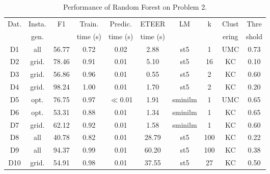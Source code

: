 \begin{table}[t]
{\small
\begin{center}  
\setlength{\tabcolsep}{2pt}
\caption{Performance of Random Forest on Problem 2.} 
\vspace{-10pt}
\label{tab:lr-with-data-features}
\begin{tabular}{|c|c|c|c|c|c|c|c|c|c|}
\hline
\multirow{2}{*}{Dat.} & Insta. & \multirow{2}{*}{F1} & Train.  & Predic.  & ETEER  & \multirow{2}{*}{LM} & \multirow{2}{*}{k} & Clust & Thre \\
 & gen. & & time (s) & time (s) &  time (s) &  &  & ering & shold \\
\hline
\hline
D1 & all & 56.77 & 0.72 & 0.02 & 2.88 & st5 & 1 & UMC & 0.73 \\
D2 & grid. & 78.46 & 0.91 & 0.01 & 5.10 & st5 & 16 & KC & 0.10 \\
D3 & grid. & 56.86 & 0.96 & 0.01 & 0.55 & st5 & 2 & KC & 0.60 \\
D4 & grid. & 98.24 & 1.00 & 0.01 & 1.70 & st5 & 2 & KC & 0.20 \\
D5 & opt. & 76.75 & 0.97 & $\ll$0.01 & 1.91 & sminilm & 1 & UMC & 0.65 \\
D6 & opt. & 53.31 & 0.88 & 0.01 & 1.34 & sminilm & 1 & KC & 0.65 \\
D7 & grid. & 62.12 & 0.92 & 0.01 & 1.58 & sminilm & 1 & KC & 0.60 \\
D8 & all & 40.78 & 0.82 & 0.01 & 28.79 & st5 & 100 & KC & 0.22 \\
D9 & all & 94.37 & 0.99 & 0.01 & 60.20 & st5 & 100 & KC & 0.38 \\
D10 & grid. & 54.91 & 0.98 & 0.01 & 37.55 & st5 & 27 & KC & 0.50 \\
\hline
\end{tabular}
\end{center}  
}
\vspace{-10pt}
\end{table}
